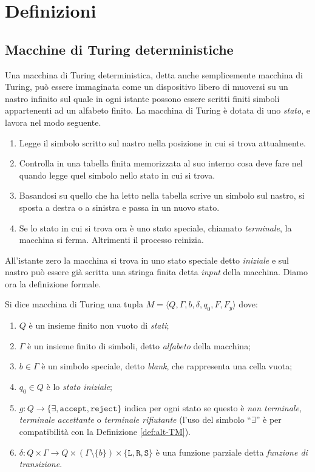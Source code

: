 \chapter{Definizioni}


\section{Macchine di Turing deterministiche}
\label{sec:det-TM}
Una macchina di Turing deterministica, detta anche semplicemente macchina di
Turing, può essere immaginata come un dispositivo libero di
muoversi su un nastro infinito sul quale in ogni istante possono essere scritti
finiti simboli appartenenti ad un alfabeto finito. La macchina di Turing è
dotata di uno \emph{stato}, e lavora nel modo seguente.
\begin{enumerate}
 \item Legge il simbolo scritto sul nastro nella posizione in cui si trova attualmente.
 \item Controlla in una tabella finita memorizzata al suo interno cosa deve fare
 nel quando legge quel simbolo nello stato in cui si trova.
 \item Basandosi su quello che ha letto nella tabella scrive un simbolo sul nastro,
 si sposta a destra o a sinistra e passa in un nuovo stato.
 \item Se lo stato in cui si trova ora è uno stato speciale, chiamato \emph{terminale},
 la macchina si ferma. Altrimenti il processo reinizia.
\end{enumerate}
All'istante zero la macchina si trova in uno stato speciale detto \emph{iniziale}
e sul nastro può essere già scritta una stringa finita detta \emph{input} della macchina.
Diamo ora la definizione formale.
\begin{definizione}
Si dice macchina di Turing una tupla
$M=\langle Q, \Gamma, b, \delta, q_0, F, F_y \rangle$ dove:
\begin{enumerate}
 \item $Q$ è un insieme finito non vuoto di \emph{stati};
 \item $\Gamma$ è un insieme finito di simboli, detto \emph{alfabeto} della macchina;
 \item $b \in \Gamma$ è un simbolo speciale, detto \emph{blank}, che rappresenta
 una cella vuota;
 \item $q_0 \in Q$ è lo \emph{stato iniziale};
 \item $g: Q \to \{\exists, \texttt{accept}, \texttt{reject}\}$
  indica per ogni stato se questo è \emph{non terminale}, \emph{terminale accettante} o
  \emph{terminale rifiutante} (l'uso del simbolo ``$\exists$'' è per compatibilità
  con la Definizione \ref{def:alt-TM}).
 \item $\delta: Q \times \Gamma \to Q \times (\Gamma \setminus \{b\}) \times \{\texttt{L},\texttt{R},\texttt{S}\}$
 è una funzione parziale detta \emph{funzione di transizione}.
\end{enumerate}
\end{definizione}

